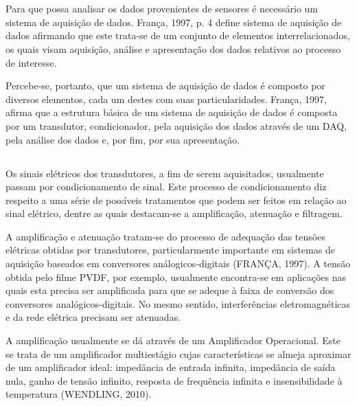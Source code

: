 \documentclass[
	12pt,				
	oneside,			
	a4paper,			
	english,			
	brazil,			
	]{abntex2ppgsi}
\begin{document}
\newpage
\section{}

Para que possa analisar os dados provenientes de sensores é necessário um sistema de aquisição de dados. França, 1997, p. 4 define sistema de aquisição de dados afirmando que este trata-se de um conjunto de elementos interrelacionados, os quais visam aquisição, análise e apresentação dos dados relativos ao processo de interesse.

Percebe-se, portanto, que um sistema de aquisição de dados é composto por diversos elementos, cada um destes com suas particularidades. França, 1997, afirma que a estrutura básica de um sistema de aquisição de dados é composta por um transdutor, condicionador, pela aquisição dos dados através de um DAQ, pela análise dos dados e, por fim, por sua apresentação. 


\subsection{}
\label{sub:condicionamento}

Os sinais elétricos dos transdutores, a fim de serem aquisitados, usualmente passam por condicionamento de sinal. Este processo de condicionamento diz respeito a uma série de possíveis tratamentos que podem ser feitos em relação ao sinal elétrico, dentre as quais destacam-se a amplificação, atenuação e filtragem. 

A amplificação e atenuação tratam-se do processo de adequação das tensões elétricas obtidas por transdutores, particularmente importante em sistemas de aquisição baseados em conversores análogicos-digitais (FRANÇA, 1997). A tensão obtida pelo filme PVDF, por exemplo, usualmente encontra-se em aplicações nas quais esta precisa ser amplificada para que se adeque à faixa de conversão dos conversores analógicos-digitais. No mesmo sentido, interferências eletromagnéticas e da rede elétrica precisam ser atenuadas. 

A amplificação usualmente se dá através de um Amplificador Operacional. Este se trata de um amplificador multiestágio cujas características se almeja aproximar de um amplificador ideal: impedância de entrada infinita, impedância de saída nula, ganho de tensão infinito, resposta de frequência infinita e insensibilidade à temperatura (WENDLING, 2010). 
\end{document}
